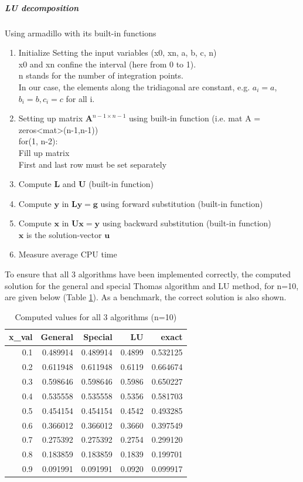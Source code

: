 \documentclass[%
oneside,                 %
final,                   %
10pt]{article}
\begin{document}
\subparagraph{LU decomposition}
Using armadillo with its built-in functions
\begin{enumerate}
\item Initialize Setting the input variables (x0, xn, a, b, c, n) \\
	x0 and xn confine the interval (here from 0 to 1). \\
	n stands for the number of integration points. \\
	In our case, the elements along the tridiagonal are constant, e.g. $a_i=a$, $b_i=b, c_i=c$ for all i. 

\item Setting up matrix $\mathbf{A}^{n-1 \times n-1}$ using built-in function (i.e. mat A = zeros<mat>(n-1,n-1))\\
	 for(1, n-2): \\
	 Fill up matrix \\
	 First and last row must be set separately
		
\item Compute $\mathbf{L}$ and $\mathbf{U}$ (built-in function)

\item Compute $\mathbf{y}$ in $\mathbf{Ly}=\mathbf{g}$ using forward substitution (built-in function)

\item Compute $\mathbf{x}$ in $\mathbf{Ux}=\mathbf{y}$ using backward substitution (built-in function)\\
		$\mathbf{x}$ is the solution-vector $\mathbf{u}$ 

\item Measure average CPU time		
\end{enumerate}
To ensure that all 3 algorithms have been implemented correctly, the computed solution for the general and special Thomas algorithm and LU method, for n=10, are given below (Table \ref{tbl:Values_n10}). As a benchmark, the correct solution is also shown.
\begin{table}[H]
\caption{Computed values for all 3 algorithms (n=10)}
\centering
\begin{tabular}{rrrrr}
\toprule
 x\_val &  General &  Special &   LU &   exact \\
\midrule
  0.1 & 0.489914 & 0.489914 & 0.4899 & 0.532125 \\
  0.2 & 0.611948 & 0.611948 & 0.6119 & 0.664674 \\
  0.3 & 0.598646 & 0.598646 & 0.5986 & 0.650227 \\
  0.4 & 0.535558 & 0.535558 & 0.5356 & 0.581703 \\
  0.5 & 0.454154 & 0.454154 & 0.4542 & 0.493285 \\
  0.6 & 0.366012 & 0.366012 & 0.3660 & 0.397549 \\
  0.7 & 0.275392 & 0.275392 & 0.2754 & 0.299120 \\
  0.8 & 0.183859 & 0.183859 & 0.1839 & 0.199701 \\
  0.9 & 0.091991 & 0.091991 & 0.0920 & 0.099917 \\
\bottomrule
\end{tabular}
\label{tbl:Values_n10}
\end{table}
\end{document}

